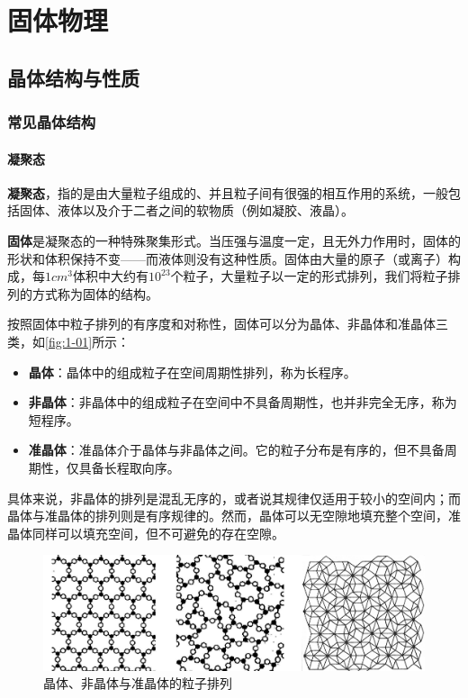 \part{固体物理}
\chapter{晶体结构与性质}
\section{常见晶体结构}
\subsection{凝聚态}
    \textbf{凝聚态}，指的是由大量粒子组成的、并且粒子间有很强的相互作用的系统，一般包括固体、液体以及介于二者之间的软物质（例如凝胶、液晶）。

    \textbf{固体}是凝聚态的一种特殊聚集形式。当压强与温度一定，且无外力作用时，固体的形状和体积保持不变——而液体则没有这种性质。固体由大量的原子（或离子）构成，每$1cm^3$体积中大约有$10^23$个粒子，大量粒子以一定的形式排列，我们将粒子排列的方式称为固体的结构。

    按照固体中粒子排列的有序度和对称性，固体可以分为晶体、非晶体和准晶体三类，如\autoref{fig:1-01}所示：
    \begin{itemize}[itemsep=0pt,parsep=0pt]
        \item \textbf{晶体}：晶体中的组成粒子在空间周期性排列，称为长程序。
        \item \textbf{非晶体}：非晶体中的组成粒子在空间中不具备周期性，也并非完全无序，称为短程序。
        \item \textbf{准晶体}：准晶体介于晶体与非晶体之间。它的粒子分布是有序的，但不具备周期性，仅具备长程取向序。
    \end{itemize}
    具体来说，非晶体的排列是混乱无序的，或者说其规律仅适用于较小的空间内；而晶体与准晶体的排列则是有序规律的。然而，晶体可以无空隙地填充整个空间，准晶体同样可以填充空间，但不可避免的存在空隙。

    \begin{figure}[!htbp]
        \centering
        \includegraphics[width=\textwidth, keepaspectratio=true]{pic/1-01}
        \caption{晶体、非晶体与准晶体的粒子排列}
        \label{fig:1-01}
    \end{figure}

